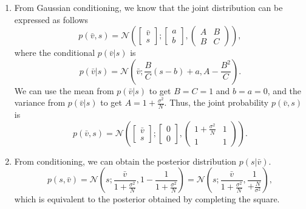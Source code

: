 \begin{enumerate}[label=\alph*.]
\item From Gaussian conditioning, we know that the joint distribution can be expressed as follows
\begin{equation}
p(\bar{v},s) = \mathcal{N}\left( \left[\begin{array}{c}
\bar{v}\\
s
\end{array}\right]; \left[\begin{array}{c}
a\\
b
\end{array}\right], \left(\begin{array}{cc}
A & B\\
B & C
\end{array}\right) \right),
\end{equation}
where the conditional $p(\bar{v}|s)$ is
\begin{equation}
p(\bar{v}|s) = \mathcal{N}\left(\bar{v}; \frac{B}{C}(s-b) + a,A - \frac{B^2}{C}\right).
\end{equation}
We can use the mean from $p(\bar{v}|s)$ to get $B=C=1$ and $b=a=0$, and the variance from $p(\bar{v}|s)$ to get $A=1 + \frac{\sigma^2}{N}$. Thus, the joint probability $p(\bar{v},s)$ is
\begin{equation}
p(\bar{v},s) = \mathcal{N}\left( \left[\begin{array}{c}
\bar{v}\\
s
\end{array}\right]; \left[\begin{array}{c}
0\\
0
\end{array}\right], \left(\begin{array}{cc}
1 + \frac{\sigma^2}{N} & 1\\
1 & 1
\end{array}\right) \right).
\end{equation}

\item From conditioning, we can obtain the posterior distribution $p(s| \bar{v})$.
\begin{equation}
p(s, \bar{v}) = \mathcal{N}\left(s; \frac{\bar{v}}{1 + \frac{\sigma^2}{N}}, 1 - \frac{1}{1 + \frac{\sigma^2}{N}}\right) = \mathcal{N}\left(s; \frac{\bar{v}}{1 + \frac{\sigma^2}{N}}, \frac{1}{ + \frac{N}{\sigma^2}}\right),
\end{equation}
which is equivalent to the posterior obtained by completing the square.

\end{enumerate}
